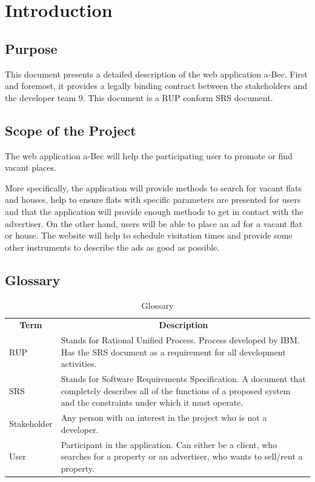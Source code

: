 \section{Introduction}

\subsection{Purpose}
This document presents a detailed description of the web application a-Bec.
First and foremost, it provides a legally binding contract between the
stakeholders and the developer team 9. This document is a RUP conform SRS document.

\subsection{Scope of the Project}
The web application a-Bec will help the participating user to promote or
find vacant places.

More specifically, the application will provide methods to search for vacant
flats and houses, help to ensure flats with specific parameters are presented for users and
that the application will provide enough methods to get in contact with the
advertiser. On the other hand, users will be able to place an ad for a vacant
flat or house. The website will help to schedule visitation times and provide some other instruments to describe
the ads as good as possible.

\subsection{Glossary}

\begin{table}[H]
	\centering
	\begin{tabular}{p{3cm}p{9cm}}
	\multicolumn{1}{c}{\textbf{Term}} & \multicolumn{1}{c}{\textbf{Description}} \\

RUP & Stands for Rational Unified Process. Process developed by IBM. Has the SRS document as a requirement for all development activities. \\
SRS & Stands for Software Requirements Specification. A document that completely describes all of the functions of a proposed system and the constraints under which it must operate. \\
Stakeholder & Any person with an interest in the project who is not a developer. \\
User & Participant in the application. Can either be a client, who searches
for a property or an advertiser, who wants to sell/rent a property.
	\end{tabular}
	\caption{Glossary}
	\label{table-glossary}
\end{table}

